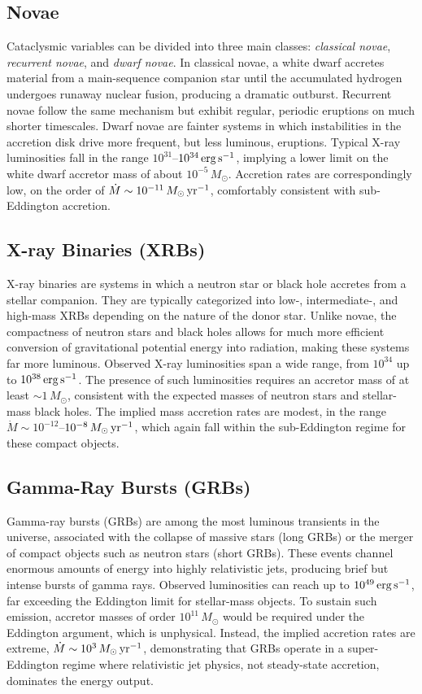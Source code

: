 \subsection{Novae}
Cataclysmic variables can be divided into three main classes: \emph{classical novae}, 
\emph{recurrent novae}, and \emph{dwarf novae}. In classical novae, a white dwarf accretes material 
from a main-sequence companion star until the accumulated hydrogen undergoes runaway nuclear fusion, 
producing a dramatic outburst. Recurrent novae follow the same mechanism but exhibit regular, 
periodic eruptions on much shorter timescales. Dwarf novae are fainter systems in which instabilities 
in the accretion disk drive more frequent, but less luminous, eruptions.  
Typical X-ray luminosities fall in the range $10^{31}$--$10^{34}\,{\rm erg\,s^{-1}}$, implying 
a lower limit on the white dwarf accretor mass of about $10^{-5}\,M_\odot$. 
Accretion rates are correspondingly low, on the order of 
$\dot{M} \sim 10^{-11}\,M_\odot\,{\rm yr^{-1}}$, comfortably consistent with sub-Eddington accretion.

\subsection{X-ray Binaries (XRBs)}
X-ray binaries are systems in which a neutron star or black hole accretes from a stellar companion. 
They are typically categorized into low-, intermediate-, and high-mass XRBs depending on the nature 
of the donor star. Unlike novae, the compactness of neutron stars and black holes allows for much more 
efficient conversion of gravitational potential energy into radiation, making these systems far more 
luminous. Observed X-ray luminosities span a wide range, from $10^{34}$ up to $10^{38}\,{\rm erg\,s^{-1}}$. 
The presence of such luminosities requires an accretor mass of at least $\sim 1\,M_\odot$, 
consistent with the expected masses of neutron stars and stellar-mass black holes. 
The implied mass accretion rates are modest, in the range 
$\dot{M} \sim 10^{-12}$--$10^{-8}\,M_\odot\,{\rm yr^{-1}}$, which again fall within the 
sub-Eddington regime for these compact objects.

\subsection{Gamma-Ray Bursts (GRBs)}
Gamma-ray bursts (GRBs) are among the most luminous transients in the universe, 
associated with the collapse of massive stars (long GRBs) or the merger of compact objects such as 
neutron stars (short GRBs). These events channel enormous amounts of energy into highly relativistic jets, 
producing brief but intense bursts of gamma rays. Observed luminosities can reach up to 
$10^{49}\,{\rm erg\,s^{-1}}$, far exceeding the Eddington limit for stellar-mass objects. 
To sustain such emission, accretor masses of order $10^{11}\,M_\odot$ would be required under the 
Eddington argument, which is unphysical. Instead, the implied accretion rates are extreme, 
$\dot{M} \sim 10^{3}\,M_\odot\,{\rm yr^{-1}}$, demonstrating that GRBs operate in a 
super-Eddington regime where relativistic jet physics, not steady-state accretion, dominates the 
energy output.

